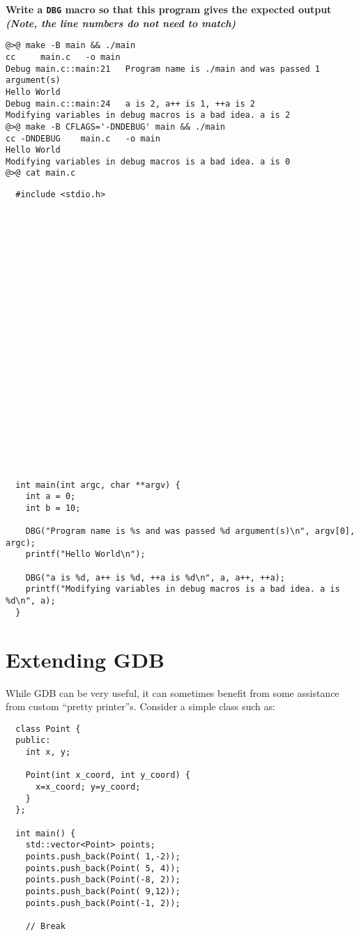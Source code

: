 \documentclass{article}
\begin{document}
\textbf{Write a \texttt{DBG} macro so that this program gives the expected output\\
  \emph{\small(Note, the line numbers do not need to match)}}

\begin{lstlisting}
@>@ make -B main && ./main
cc     main.c   -o main
Debug main.c::main:21	Program name is ./main and was passed 1 argument(s)
Hello World
Debug main.c::main:24	a is 2, a++ is 1, ++a is 2
Modifying variables in debug macros is a bad idea. a is 2
@>@ make -B CFLAGS='-DNDEBUG' main && ./main
cc -DNDEBUG    main.c   -o main
Hello World
Modifying variables in debug macros is a bad idea. a is 0
@>@ cat main.c
\end{lstlisting}

\begin{lstlisting}
  #include <stdio.h>
























  int main(int argc, char **argv) {
    int a = 0;
    int b = 10;

    DBG("Program name is %s and was passed %d argument(s)\n", argv[0], argc);
    printf("Hello World\n");

    DBG("a is %d, a++ is %d, ++a is %d\n", a, a++, ++a);
    printf("Modifying variables in debug macros is a bad idea. a is %d\n", a);
  }
\end{lstlisting}


\newpage
\section{Extending GDB}
While GDB can be very useful, it can sometimes benefit from some assistance
from custom ``pretty printer''s. Consider a simple class such as:

\begin{lstlisting}
  class Point {
  public:
    int x, y;

    Point(int x_coord, int y_coord) {
      x=x_coord; y=y_coord;
    }
  };

  int main() {
    std::vector<Point> points;
    points.push_back(Point( 1,-2));
    points.push_back(Point( 5, 4));
    points.push_back(Point(-8, 2));
    points.push_back(Point( 9,12));
    points.push_back(Point(-1, 2));

    // Break
\end{lstlisting}
\end{document}
